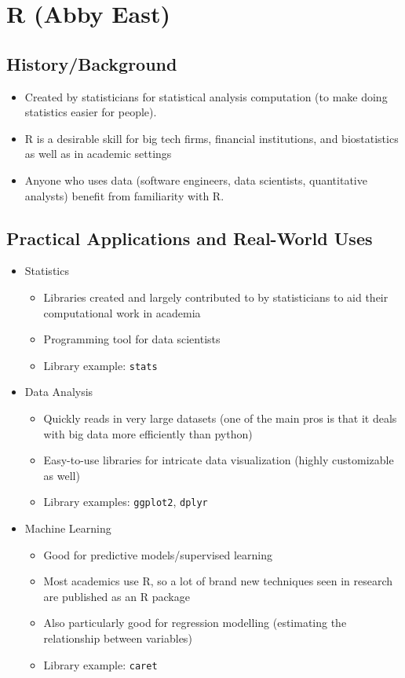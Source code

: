 \section{R (Abby East)}

\subsection{History/Background}
\begin{itemize}
	\item Created by statisticians for statistical analysis computation (to make doing statistics easier for people). \cite{simplilearn_what_2021-1}
	\item R is a desirable skill for big tech firms, financial institutions, and biostatistics as well as in academic settings
	\item Anyone who uses data (software engineers, data scientists, quantitative analysts) benefit from familiarity with R. \cite{microsoft_what_2015}
\end{itemize}

\subsection{Practical Applications and Real-World Uses \cite{simplilearn_what_2021-1}}
\begin{itemize}
	\item Statistics
	\begin{itemize}
		\item Libraries created and largely contributed to by statisticians to aid their computational work in academia
		\item Programming tool for data scientists
		\item Library example: \texttt{stats}
	\end{itemize}

	\item Data Analysis
	\begin{itemize}
		\item Quickly reads in very large datasets (one of the main pros is that it deals with big data more efficiently than python)
		\item Easy-to-use libraries for intricate data visualization (highly customizable as well)
		\item Library examples: \texttt{ggplot2}, \texttt{dplyr}
	\end{itemize}

	\item Machine Learning
	\begin{itemize}
		\item Good for predictive models/supervised learning
		\item Most academics use R, so a lot of brand new techniques seen in research are published as an R package
		\item Also particularly good for regression modelling (estimating the relationship between variables)
		\item Library example: \texttt{caret}
	\end{itemize}
\end{itemize}


